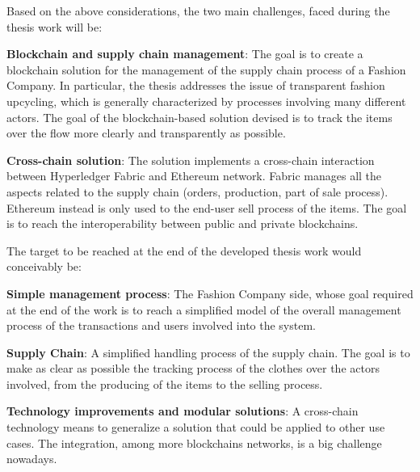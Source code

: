 Based on the above considerations, the two main challenges, faced during the thesis work will be:
\begin{outline}
    \1 \textbf{Blockchain and supply chain management}: The goal is to create a blockchain solution for the 
    management of the supply chain process of a Fashion Company. In particular, the thesis addresses the 
    issue of transparent fashion upcycling, which is generally characterized by processes involving many 
    different actors. The goal of the blockchain-based solution devised is to track the items over the flow 
    more clearly and transparently as possible.

    \1 \textbf{Cross-chain solution}: The solution implements a cross-chain interaction between Hyperledger 
    Fabric and Ethereum network. Fabric manages all the aspects related to the supply chain (orders, 
    production, part of sale process). Ethereum instead is only used to the end-user sell process of 
    the items. The goal is to reach the interoperability between public and private blockchains. 
\end{outline}

\bigskip

The target to be reached at the end of the developed thesis work would conceivably be:

\begin{outline}
    \1 \textbf{Simple management process}: The Fashion Company side, whose goal required at the end of the work is to
    reach a simplified model of the overall management process of the transactions and users involved into the system.

    \1 \textbf{Supply Chain}: A simplified handling process of the supply chain. The goal is to make as
    clear as possible the tracking process of the clothes over the actors involved, from the producing of the items
    to the selling process. 

    \1 \textbf{Technology improvements and modular solutions}: A cross-chain technology means to generalize a 
    solution that could be applied to other use cases. The integration, among more blockchains networks,
    is a big challenge nowadays.
\end{outline}